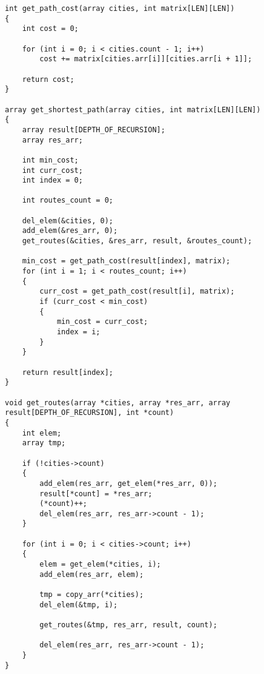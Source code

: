\begin{lstlisting}[label=some-code,caption=Алгоритм полного перебора]
int get_path_cost(array cities, int matrix[LEN][LEN])
{
	int cost = 0;

	for (int i = 0; i < cities.count - 1; i++)
		cost += matrix[cities.arr[i]][cities.arr[i + 1]];

	return cost;
}

array get_shortest_path(array cities, int matrix[LEN][LEN])
{
	array result[DEPTH_OF_RECURSION];
	array res_arr;

	int min_cost;
	int curr_cost;
	int index = 0;

	int routes_count = 0;

	del_elem(&cities, 0);
	add_elem(&res_arr, 0);
	get_routes(&cities, &res_arr, result, &routes_count);

	min_cost = get_path_cost(result[index], matrix);
	for (int i = 1; i < routes_count; i++)
	{
		curr_cost = get_path_cost(result[i], matrix);
		if (curr_cost < min_cost)
		{
			min_cost = curr_cost;
			index = i;
		}
	}

	return result[index];
}

void get_routes(array *cities, array *res_arr, array result[DEPTH_OF_RECURSION], int *count)
{
	int elem;
	array tmp;

	if (!cities->count)
	{
		add_elem(res_arr, get_elem(*res_arr, 0));
		result[*count] = *res_arr;
		(*count)++;
		del_elem(res_arr, res_arr->count - 1);
	}

	for (int i = 0; i < cities->count; i++)
	{
		elem = get_elem(*cities, i);
		add_elem(res_arr, elem);

		tmp = copy_arr(*cities);
		del_elem(&tmp, i);

		get_routes(&tmp, res_arr, result, count);

		del_elem(res_arr, res_arr->count - 1);
	}
}
\end{lstlisting}

